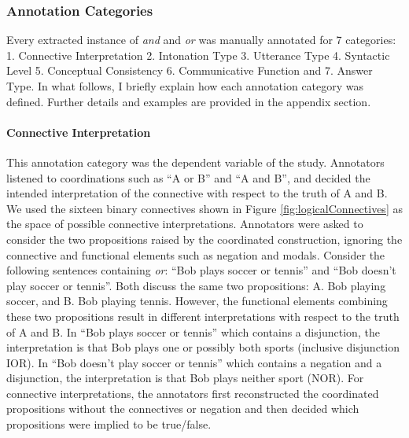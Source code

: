 \documentclass[floatsintext,man]{apa6}
\theoremstyle{definition}
\theoremstyle{definition}
\theoremstyle{definition}
\theoremstyle{remark}
\begin{document}
\subsubsection{Annotation Categories}\label{annotation-categories}

Every extracted instance of \emph{and} and \emph{or} was manually
annotated for 7 categories: 1. Connective Interpretation 2. Intonation
Type 3. Utterance Type 4. Syntactic Level 5. Conceptual Consistency 6.
Communicative Function and 7. Answer Type. In what follows, I briefly
explain how each annotation category was defined. Further details and
examples are provided in the appendix section.

\paragraph{Connective Interpretation}\label{connective-interpretation}

This annotation category was the dependent variable of the study.
Annotators listened to coordinations such as \enquote{A or B} and
\enquote{A and B}, and decided the intended interpretation of the
connective with respect to the truth of A and B. We used the sixteen
binary connectives shown in Figure \ref{fig:logicalConnectives} as the
space of possible connective interpretations. Annotators were asked to
consider the two propositions raised by the coordinated construction,
ignoring the connective and functional elements such as negation and
modals. Consider the following sentences containing \emph{or}:
\enquote{Bob plays soccer or tennis} and \enquote{Bob doesn't play
soccer or tennis}. Both discuss the same two propositions: A. Bob
playing soccer, and B. Bob playing tennis. However, the functional
elements combining these two propositions result in different
interpretations with respect to the truth of A and B. In \enquote{Bob
plays soccer or tennis} which contains a disjunction, the interpretation
is that Bob plays one or possibly both sports (inclusive disjunction
IOR). In \enquote{Bob doesn't play soccer or tennis} which contains a
negation and a disjunction, the interpretation is that Bob plays neither
sport (NOR). For connective interpretations, the annotators first
reconstructed the coordinated propositions without the connectives or
negation and then decided which propositions were implied to be
true/false.
\end{document}
